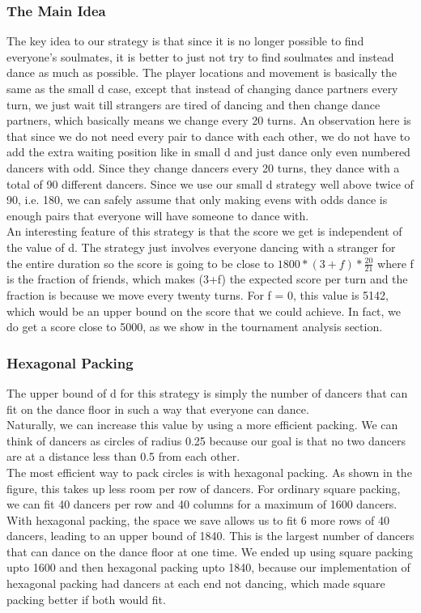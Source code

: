 \subsubsection{The Main Idea}
The key idea to our strategy is that since it is no longer possible to find everyone's soulmates, it is better to just not try to find soulmates and instead dance as much as possible. The player locations and movement is basically the same as the small d case, except that instead of changing dance partners every turn, we just wait till strangers are tired of dancing and then change dance partners, which basically means we change every 20 turns. An observation here is that since we do not need every pair to dance with each other, we do not have to add the extra waiting position like in small d and just dance only even numbered dancers with odd. Since they change dancers every 20 turns, they dance with a total of 90 different dancers. Since we use our small d strategy well above twice of 90, i.e. 180, we can safely assume that only making evens with odds dance is enough pairs that everyone will have someone to dance with.\\
An interesting feature of this strategy is that the score we get is independent of the value of d. The strategy just involves everyone dancing with a stranger for the entire duration so the score is going to be close to $1800*(3+f)*\frac{20}{21}$ where f is the fraction of friends, which makes (3+f) the expected score per turn and the fraction is because we move every twenty turns. For f = 0, this value is 5142, which would be an upper bound on the score that we could achieve. In fact, we do get a score close to 5000, as we show in the tournament analysis section.\\ 
\subsubsection{Hexagonal Packing}
The upper bound of d for this strategy is simply the number of dancers that can fit on the dance floor in such a way that everyone can dance.\\
Naturally, we can increase this value by using a more efficient packing. We can think of dancers as circles of radius 0.25 because our goal is that no two dancers are at a distance less than 0.5 from each other.\\
The most efficient way to pack circles is with hexagonal packing. As shown in the figure, this takes up less room per row of dancers. For ordinary square packing, we can fit 40 dancers per row and 40 columns for a maximum of 1600 dancers. With hexagonal packing, the space we save allows us to fit 6 more rows of 40 dancers, leading to an upper bound of 1840. This is the largest number of dancers that can dance on the dance floor at one time. We ended up using square packing upto 1600 and then hexagonal packing upto 1840, because our implementation of hexagonal packing had dancers at each end not dancing, which made square packing better if both would fit.\\
